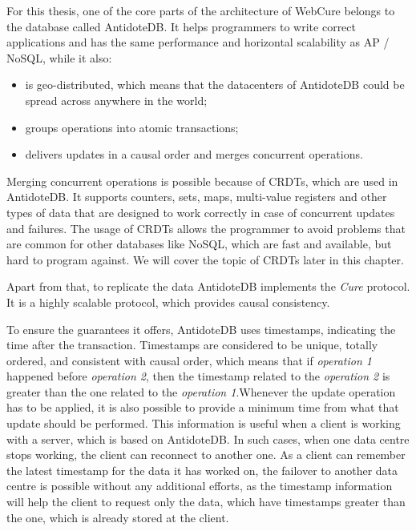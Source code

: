 For this thesis, one of the core parts of the architecture of WebCure belongs to the database called AntidoteDB\cite{4}. It helps programmers to write correct applications and has the same performance and horizontal scalability as AP / NoSQL\cite{14}, while it also:

\begin{itemize}
\item {is geo-distributed, which means that the datacenters of AntidoteDB could be spread across anywhere in the world;}
\item {groups operations into atomic transactions\cite{9, 15};}
\item {delivers updates in a causal order and merges concurrent operations.}
\end{itemize} 

Merging concurrent operations is possible because of CRDTs\cite{2}, which are used in AntidoteDB. It supports counters, sets, maps, multi-value registers and other types of data that are designed to work correctly in case of concurrent updates and failures. The usage of CRDTs allows the programmer to avoid problems that are common for other databases like NoSQL, which are fast and available, but hard to program against\cite{15}. We will cover the topic of CRDTs later in this chapter.

Apart from that, to replicate the data AntidoteDB implements the \textit{Cure}\cite{15} protocol. It is a highly scalable protocol, which provides causal consistency. 

To ensure the guarantees it offers, AntidoteDB uses timestamps, indicating the time after the transaction. Timestamps are considered to be unique, totally ordered, and consistent with causal order, which means that if \textit{operation 1} happened before \textit{operation 2}, then the timestamp related to the \textit{operation 2} is greater than the one related to the \textit{operation 1}\cite{2}.Whenever the update operation has to be applied, it is also possible to provide a minimum time from what that update should be performed. This information is useful when a client is working with a server, which is based on AntidoteDB. In such cases, when one data centre stops working, the client can reconnect to another one. As a client can remember the latest timestamp for the data it has worked on, the failover to another data centre is possible without any additional efforts, as the timestamp information will help the client to request only the data, which have timestamps greater than the one, which is already stored at the client.

